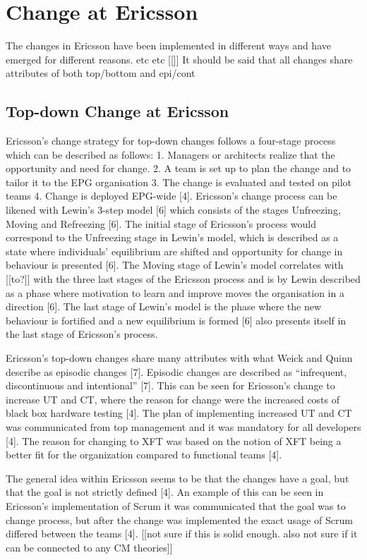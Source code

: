 \documentclass[fina_report_innit.tex]{subfiles}
\begin{document}
\section{Change at Ericsson}



The changes in Ericsson have been implemented in different ways and have emerged for different reasons. etc etc [[]]
It should be said that all changes share attributes of both top/bottom and epi/cont


\subsection*{Top-down Change at Ericsson}
Ericsson’s change strategy for top-down changes follows a four-stage process which can be described as follows: 1. Managers or architects realize that the opportunity and need for change. 2. A team is set up to plan the change and to tailor it to the EPG organisation
3. The change is evaluated and tested on pilot teams 4. Change is deployed EPG-wide [4]. Ericsson’s change process can be likened with Lewin’s 3-step model [6] which consists of the stages Unfreezing, Moving and Refreezing [6]. The initial stage of Ericsson’s process would correspond to the Unfreezing stage in Lewin’s model, which is described as a state where individuals’ equilibrium are shifted and opportunity for change in behaviour is presented [6]. The Moving stage of Lewin’s model correlates with [[to?]] with the three last stages of the Ericsson process and is by Lewin described as a phase where motivation to learn and improve moves the organisation in a direction [6]. The last stage of Lewin’s model is the phase where the new behaviour is fortified and a new equilibrium is formed [6] also presents itself in the last stage of Ericsson’s process. 

Ericsson’s top-down changes share many attributes with what Weick and Quinn describe as episodic changes [7]. Episodic changes are described as “infrequent, discontinuous and intentional” [7]. This can be seen for Ericsson’s change to increase UT and CT, where the reason for change were the increased costs of black box hardware testing [4]. The plan of implementing increased UT and CT was communicated from top management and it was mandatory for all developers [4]. The reason for changing to XFT was based on the notion of XFT being a better fit for the organization compared to functional teams [4]. 

The general idea within Ericsson seems to be that the changes have a goal, but that the goal is not strictly defined [4]. An example of this can be seen in Ericsson’s implementation of Scrum it was communicated that the goal was to change process, but after the change was implemented the exact usage of Scrum differed between the teams [4]. [[not sure if this is solid enough. also not sure if it can be connected to any CM theories]]
\end{document}
